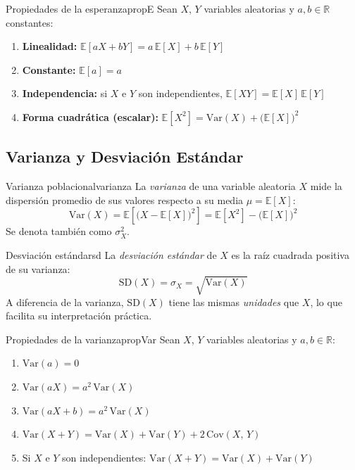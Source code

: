 \documentclass[12pt, a4paper]{article}
\newcommand{\E}[1]{\mathbb{E}\!\left[#1\right]}
\newcommand{\Var}[1]{\mathrm{Var}\!\left(#1\right)}
\newcommand{\Cov}[2]{\mathrm{Cov}\!\left(#1,\,#2\right)}
\newcommand{\SD}[1]{\mathrm{SD}\!\left(#1\right)}
\begin{document}
\begin{proposicion}{Propiedades de la esperanza}{propE}
Sean $X$, $Y$ variables aleatorias y $a, b \in \mathbb{R}$ constantes:
\begin{enumerate}[label=(\roman*)]
  \item \textbf{Linealidad:} $\E{aX + bY} = a\,\E{X} + b\,\E{Y}$
  \item \textbf{Constante:} $\E{a} = a$
  \item \textbf{Independencia:} si $X$ e $Y$ son independientes,
        $\E{XY} = \E{X}\,\E{Y}$
  \item \textbf{Forma cuadrática (escalar):}
        $\E{X^2} = \Var{X} + \bigl(\E{X}\bigr)^2$
\end{enumerate}
\end{proposicion}

\bigskip

\subsection{Varianza y Desviación Estándar}

\begin{definicion}{Varianza poblacional}{varianza}
La \emph{varianza} de una variable aleatoria $X$ mide la dispersión
promedio de sus valores respecto a su media $\mu = \E{X}$:
\[
  \Var{X}
    = \E{\bigl(X - \E{X}\bigr)^2}
    = \E{X^2} - \bigl(\E{X}\bigr)^2
\]
Se denota también como $\sigma_X^2$.
\end{definicion}

\begin{definicion}{Desviación estándar}{sd}
La \emph{desviación estándar} de $X$ es la raíz cuadrada positiva de su
varianza:
\[
  \SD{X} = \sigma_X = \sqrt{\Var{X}}
\]
A diferencia de la varianza, $\SD{X}$ tiene las mismas \emph{unidades} que $X$,
lo que facilita su interpretación práctica.
\end{definicion}

\begin{proposicion}{Propiedades de la varianza}{propVar}
Sean $X$, $Y$ variables aleatorias y $a, b \in \mathbb{R}$:
\begin{enumerate}[label=(\roman*)]
  \item $\Var{a} = 0$
  \item $\Var{aX} = a^2\,\Var{X}$
  \item $\Var{aX + b} = a^2\,\Var{X}$
  \item $\Var{X + Y} = \Var{X} + \Var{Y} + 2\,\Cov{X}{Y}$
  \item Si $X$ e $Y$ son independientes:
        $\Var{X + Y} = \Var{X} + \Var{Y}$
\end{enumerate}
\end{proposicion}
\end{document}
